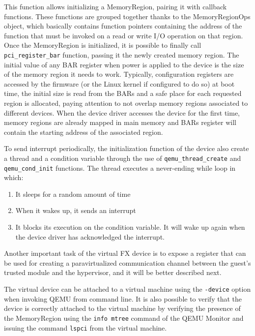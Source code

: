 This function allows initializing a MemoryRegion, pairing it with callback functions. These functions are grouped together thanks to the MemoryRegionOps object, which basically contains function pointers containing the address of the function that must be invoked on a read or write I/O operation on that region. Once the MemoryRegion is initialized, it is possible to finally call \texttt{pci\_register\_bar} function, passing it the newly created memory region. The initial value of any BAR register when power is applied to the device is the size of the memory region it needs to work. Typically, configuration registers are accessed by the firmware (or the Linux kernel if configured to do so) at boot time, the initial size is read from the BARs and a safe place for each requested region is allocated, paying attention to not overlap memory regions associated to different devices. When the device driver accesses the device for the first time, memory regions are already mapped in main memory and BARs register will contain the starting address of the associated region.
\par 
To send interrupt periodically, the initialization function of the device also create a thread and a condition variable through the use of \texttt{qemu\_thread\_create} and \texttt{qemu\_cond\_init} functions. The thread executes a never-ending while loop in which: 
\begin{enumerate}
    \item It sleeps for a random amount of time
    \item When it wakes up, it sends an interrupt
    \item It blocks its execution on the condition variable. It will wake up again when the device driver has acknowledged the interrupt.  
\end{enumerate}
\par
Another important task of the virtual FX device is to expose a register that can be used for creating a paravirtualized communication channel between the guest's trusted module and the hypervisor, and it will be better described next.
\par 
The virtual device can be attached to a virtual machine using the \texttt{-device} option when invoking QEMU from command line. It is also possible to verify that the device is correctly attached to the virtual machine by verifying the presence of the MemoryRegion using the \texttt{info mtree} command of the QEMU Monitor and issuing the command \texttt{lspci} from the virtual machine. 

